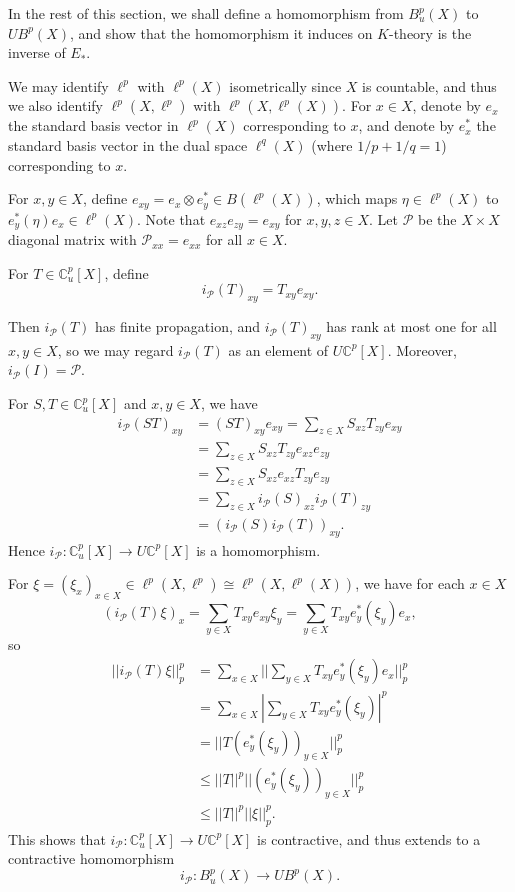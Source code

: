 \documentclass[a4,11pt]{amsart}
\theoremstyle{remark}
\begin{document}
In the rest of this section, we shall define a homomorphism from $B^p_u(X)$ to $UB^p(X)$, and show that the homomorphism it induces on $K$-theory is the inverse of $E_*$.

We may identify $\ell^p$ with $\ell^p(X)$ isometrically since $X$ is countable, and thus we also identify $\ell^p(X,\ell^p)$ with $\ell^p(X,\ell^p(X))$. 
For $x\in X$, denote by $e_x$ the standard basis vector in $\ell^p(X)$ corresponding to $x$, and denote by $e_x^*$ the standard basis vector in the dual space $\ell^q(X)$ (where $1/p+1/q=1$) corresponding to $x$. 

For $x,y\in X$, define $e_{xy}=e_x\otimes e_y^*\in B(\ell^p(X))$, which maps $\eta\in\ell^p(X)$ to $e_y^*(\eta)e_x\in\ell^p(X)$. 
Note that $e_{xz}e_{zy}=e_{xy}$ for $x,y,z\in X$.
Let $\mathcal{P}$ be the $X\times X$ diagonal matrix with $\mathcal{P}_{xx}=e_{xx}$ for all $x\in X$.

For $T\in\mathbb{C}^p_u[X]$, define \[i_\mathcal{P}(T)_{xy}=T_{xy}e_{xy}.\]

Then $i_\mathcal{P}(T)$ has finite propagation, and $i_\mathcal{P}(T)_{xy}$ has rank at most one for all $x,y\in X$, so we may regard $i_\mathcal{P}(T)$ as an element of $U\mathbb{C}^p[X]$.
Moreover, $i_\mathcal{P}(I)=\mathcal{P}$.

For $S,T\in\mathbb{C}^p_u[X]$ and $x,y\in X$, we have 
\begin{align*}
i_\mathcal{P}(ST)_{xy} &= (ST)_{xy}e_{xy} = \sum_{z\in X}S_{xz}T_{zy}e_{xy} \\
&= \sum_{z\in X}S_{xz}T_{zy}e_{xz}e_{zy} \\ 
&= \sum_{z\in X}S_{xz}e_{xz}T_{zy}e_{zy} \\
&= \sum_{z\in X}i_\mathcal{P}(S)_{xz}i_\mathcal{P}(T)_{zy} \\
&= (i_\mathcal{P}(S)i_\mathcal{P}(T))_{xy}.
\end{align*}
Hence $i_\mathcal{P}:\mathbb{C}^p_u[X]\rightarrow U\mathbb{C}^p[X]$ is a homomorphism.

For $\xi=(\xi_x)_{x\in X}\in\ell^p(X,\ell^p)\cong\ell^p(X,\ell^p(X))$, we have for each $x\in X$
\[(i_\mathcal{P}(T)\xi)_x=\sum_{y\in X}T_{xy}e_{xy}\xi_y=\sum_{y\in X}T_{xy}e_y^*(\xi_y)e_x,\] so
\begin{align*}
||i_\mathcal{P}(T)\xi||_p^p &= \sum_{x\in X}||\sum_{y\in X}T_{xy}e_y^*(\xi_y)e_x||_p^p \\
&= \sum_{x\in X}|\sum_{y\in X}T_{xy}e_y^*(\xi_y)|^p \\
&= ||T(e_y^*(\xi_y))_{y\in X}||_p^p \\
&\leq ||T||^p||(e_y^*(\xi_y))_{y\in X}||_p^p \\
&\leq ||T||^p||\xi||_p^p.
\end{align*}
This shows that $i_\mathcal{P}:\mathbb{C}^p_u[X]\rightarrow U\mathbb{C}^p[X]$ is contractive, and thus extends to a contractive homomorphism
\[ i_\mathcal{P}:B^p_u(X)\rightarrow UB^p(X). \]
\end{document}
